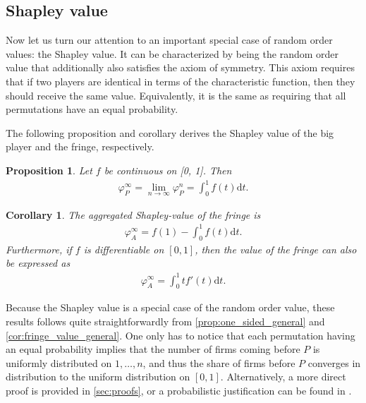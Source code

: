 \documentclass[a4paper]{article}
\newtheorem{proposition}{Proposition}
\newtheorem{corollary}{Corollary}
\newcommand{\dt}{\mathrm{d}t}
\begin{document}
\subsection{Shapley value}

Now let us turn our attention to an important special case of random order values: the Shapley value.
It can be characterized by being the random order value that additionally also satisfies the axiom of symmetry.
This axiom requires that if two players are identical in terms of the characteristic function, then they should receive the same value.
Equivalently, it is the same as requiring that all permutations have an equal probability.

The following proposition and corollary derives the Shapley value of the big player and the fringe, respectively.

\begin{proposition}
    \label{prop:one_sided}
    Let $f$ be continuous on [0, 1]. Then
    \begin{align*}
        \varphi_P^\infty = \lim_{n \to \infty} \varphi_P^n = \int_0^1 f(t) \dt .
    \end{align*}
\end{proposition}

\begin{corollary}
    \label{cor:fringe_value}
    The aggregated Shapley-value of the fringe is
    \begin{align*}
        \varphi_A^\infty = f(1) - \int_0^1 f(t) \dt.
    \end{align*}
    Furthermore, if $f$ is differentiable on $[0, 1]$, then the value of the fringe can also be expressed as
    \begin{align*}
        \varphi_A^\infty = \int_0^1 t f'(t) \dt.
    \end{align*}
\end{corollary}

Because the Shapley value is a special case of the random order value, these results follows quite straightforwardly from \cref{prop:one_sided_general} and \cref{cor:fringe_value_general}.
One only has to notice that each permutation having an equal probability implies that the number of firms coming before $P$ is uniformly distributed on $1, \dots, n$, and thus the share of firms before $P$ converges in distribution to the uniform distribution on $[0, 1]$.
Alternatively, a more direct proof is provided in \cref{sec:proofs}, or a probabilistic justification can be found in \textcite{levy1997individual}.
\end{document}
